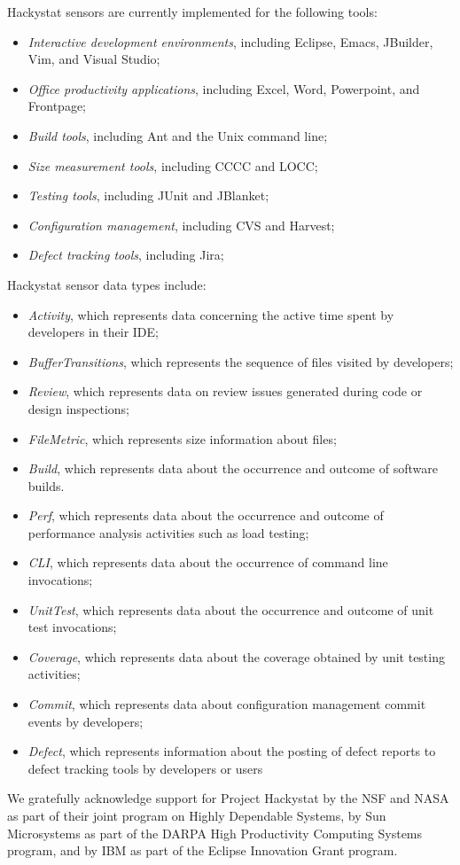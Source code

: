 \documentclass[11pt,twocolumn]{article}
\begin{document}
Hackystat sensors are currently implemented for the following tools:
\begin{itemize}
\item {\em Interactive development environments}, including Eclipse, 
Emacs, JBuilder, Vim, and Visual Studio;
\item {\em Office productivity applications}, including Excel, Word,
Powerpoint, and Frontpage;
\item {\em Build tools}, including Ant and the Unix command line;
\item {\em Size measurement tools}, including CCCC and LOCC;
\item {\em Testing tools}, including JUnit and JBlanket;
\item {\em Configuration management}, including CVS and Harvest;
\item {\em Defect tracking tools}, including Jira;
\end{itemize}

Hackystat sensor data types include:
\begin{itemize}
\item {\em Activity}, which represents data concerning the active time spent
by developers in their IDE;
\item {\em BufferTransitions}, which represents the sequence of files visited
by developers;
\item {\em Review}, which represents data on review issues generated during
code or design inspections;
\item {\em FileMetric}, which represents size information about files;
\item {\em Build}, which represents data about the occurrence and
outcome of software builds.
\item {\em Perf}, which represents data about the occurrence and outcome of
performance analysis activities such as load testing;
\item {\em CLI}, which represents data about the occurrence of command line
invocations;
\item {\em UnitTest}, which represents data about the occurrence and
outcome of unit test invocations;
\item {\em Coverage}, which represents data about the coverage obtained by
unit testing activities;
\item {\em Commit}, which represents data about configuration management
commit events by developers;
\item {\em Defect}, which represents information about the posting of
defect reports to defect tracking tools by developers or users
\end{itemize}


We gratefully acknowledge support for Project Hackystat by the NSF and NASA
as part of their joint program on Highly Dependable Systems, by Sun
Microsystems as part of the DARPA High Productivity Computing Systems
program, and by IBM as part of the Eclipse Innovation Grant program.



\end{document}

